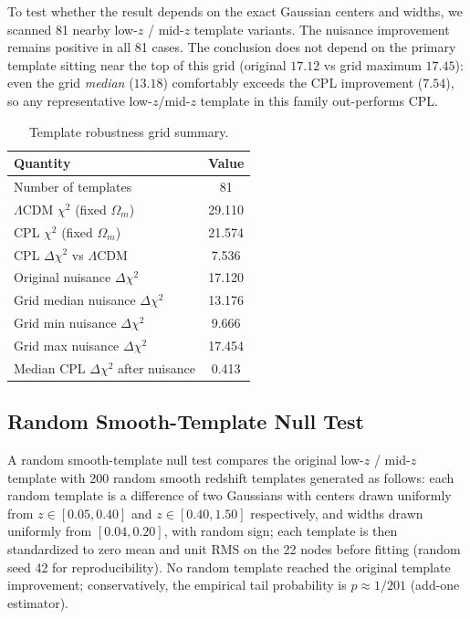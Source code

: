\documentclass[11pt]{article}
\begin{document}
To test whether the result depends on the exact Gaussian centers and widths, we scanned
81 nearby low-$z$ / mid-$z$ template variants. The nuisance improvement remains positive
in all 81 cases. The conclusion does not depend on the primary template sitting near
the top of this grid (original $17.12$ vs grid maximum $17.45$): even the grid
\emph{median} ($13.18$) comfortably exceeds the CPL improvement ($7.54$), so any
representative low-$z$/mid-$z$ template in this family out-performs CPL.

\begin{table}[h]
\centering
\caption{Template robustness grid summary.}
\label{tab:grid}
\begin{tabular}{lc}
\toprule
Quantity & Value \\
\midrule
Number of templates & 81 \\
$\Lambda$CDM $\chi^2$ (fixed $\Omega_m$) & 29.110 \\
CPL $\chi^2$ (fixed $\Omega_m$) & 21.574 \\
CPL $\Delta\chi^2$ vs $\Lambda$CDM & 7.536 \\
Original nuisance $\Delta\chi^2$ & 17.120 \\
Grid median nuisance $\Delta\chi^2$ & 13.176 \\
Grid min nuisance $\Delta\chi^2$ & 9.666 \\
Grid max nuisance $\Delta\chi^2$ & 17.454 \\
Median CPL $\Delta\chi^2$ after nuisance & 0.413 \\
\bottomrule
\end{tabular}
\end{table}

\subsection{Random Smooth-Template Null Test}

A random smooth-template null test compares the original low-$z$ / mid-$z$ template with
200 random smooth redshift templates generated as follows: each random template is a
difference of two Gaussians with centers drawn uniformly from $z\in[0.05,0.40]$ and
$z\in[0.40,1.50]$ respectively, and widths drawn uniformly from $[0.04,0.20]$, with
random sign; each template is then standardized to zero mean and unit RMS on the 22
nodes before fitting (random seed 42 for reproducibility). No random template reached
the original template improvement; conservatively, the empirical tail probability is
$p\approx1/201$ (add-one estimator).
\end{document}
